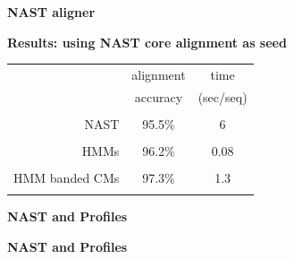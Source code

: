 \documentclass[landscape]{slides}
\begin{document}
\begin{slide}
\begin{center}
\large
\textbf{NAST aligner}
\end{center}


\vfill
\end{slide}
\begin{slide}
\begin{center}
\large
\textbf{Results: using NAST core alignment as seed}
\end{center}
\medskip
\medskip
\begin{center}

\begin{tabular}{rcc} 
& \multicolumn{1}{c}{alignment} & \multicolumn{1}{c}{time} \\
& \multicolumn{1}{c}{accuracy} & \multicolumn{1}{c}{(sec/seq)} \\ \hline
& \multicolumn{1}{c}{} & \multicolumn{1}{c}{} \\
NAST & 95.5\% & 6 \\ 
& \multicolumn{1}{c}{} & \multicolumn{1}{c}{} \\
HMMs & 96.2\% & 0.08 \\ 
& \multicolumn{1}{c}{} & \multicolumn{1}{c}{} \\
HMM banded CMs & 97.3\% & 1.3 \\ 
& \multicolumn{1}{c}{} & \multicolumn{1}{c}{} \\
\end{tabular}
\end{center}
\vfill
\end{slide}

\begin{slide}
\begin{center}
\large
\textbf{NAST and Profiles}
\end{center}


\vfill
\end{slide}
\begin{slide}
\begin{center}
\large
\textbf{NAST and Profiles}
\end{center}


\vfill
\end{slide}
\end{document}
